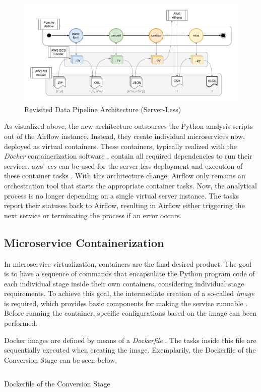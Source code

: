 \begin{figure}[h!]
	\centering
	\includegraphics[width=\linewidth]{main-matter/img/5-new-pipeline.pdf}
	\caption{Revisited Data Pipeline Architecture (Server-Less)}
	\label{fig:5-new-pipeline}
\end{figure}

As visualized above, the new architecture outsources the Python analysis scripts out of the Airflow instance. Instead, they create individual microservices now, deployed as virtual containers. These containers, typically realized with the \textit{Docker} containerization software \cite{docker}, contain all required dependencies to run their services. \ac{aws}' \textit{\ac{ecs}} can be used for the server-less deployment and execution of these container tasks \cite{ecs}. With this architecture change, Airflow only remains an orchestration tool that starts the appropriate container tasks. Now, the analytical process is no longer depending on a single virtual server instance. The tasks report their statuses back to Airflow, resulting in Airflow either triggering the next service or terminating the process if an error occurs.

\subsection{Microservice Containerization}
In microservice virtualization, containers are the final desired product. The goal is to have a sequence of commands that encapsulate the Python program code of each individual stage inside their own containers, considering individual stage requirements. To achieve this goal, the intermediate creation of a so-called \textit{image} is required, which provides basic components for making the service runnable \cite{docker}. Before running the container, specific configurations based on the image can been performed.

Docker images are defined by means of a \textit{Dockerfile} \cite{docker}. The tasks inside this file are sequentially executed when creating the image. Exemplarily, the Dockerfile of the Conversion Stage can be seen below.
\newpage
\begin{listing}
	\inputminted{dockerfile}{main-matter/src/5-convert-dockerfile}
	\caption{Dockerfile of the Conversion Stage}
	\label{src:5-convert-dockerfile}
\end{listing}

